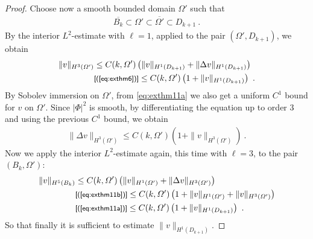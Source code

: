 \documentclass[a4paper,11pt,openright,twoside]{book}
\renewcommand{\Omega}{\varOmega}
\newcommand{\1}{\mathds{1}}
\newcommand{\commb}[1]{\textsf{{\footnotesize[#1]}}}
\newcommand{\qref}[1]{(\ref{#1})}
\theoremstyle{plain}
\theoremstyle{definition}
\theoremstyle{remark}
\begin{document}
\begin{proof}
	Choose now a smooth bounded domain $\Omega'$ such that
	\begin{align*}
		\overline{B_k}\subset \Omega' \subset \overline{\Omega'} \subset D_{k+1}
	\ . 
	\end{align*}
	By the interior $L^2$-estimate with $\ell=1$, applied to the pair $(\Omega',D_{k+1})$, we obtain
	\begin{align}\label{eq:exthm11a}
		\|v\|_{H^3(\Omega')} 
		&\leq C(k,\Omega')\left( \|v\|_{H^1(D_{k+1})}+\|\Delta v\|_{H^1(D_{k+1})}\right)\notag\\
		&\commb{\qref{eq:exthm6}}\leq C(k,\Omega')\left(1+\|v\|_{H^1(D_{k+1})}\right)
	\ . 
	\end{align}
	By Sobolev immersion on $\Omega'$, from \eqref{eq:exthm11a} we also get a uniform $C^1$ bound for $v$ on $\Omega'$. Since $|\Phi|^2$ is smooth, by differentiating the equation up to order $3$ and using the previous $C^1$ bound, we obtain
	\begin{align}\label{eq:exthm11b}
		\|\Delta v\|_{H^3(\Omega')}
		\leq C(k,\Omega')\left(1+\|v\|_{H^3(\Omega')}\right)
	\ . 
	\end{align}
	Now we apply the interior $L^2$-estimate again, this time with $\ell=3$, to the pair $(B_k,\Omega')$:
	\begin{align}\label{eq:exthm11}
		\|v\|_{H^5(B_k)} 
		&\leq C(k,\Omega') \left( \|v\|_{H^1(\Omega')} + \|\Delta v\|_{H^3(\Omega')}\right)\notag\\
		&\commb{\qref{eq:exthm11b}}\leq C(k,\Omega') \left( 1+\|v\|_{H^1(\Omega')} + \|v\|_{H^3(\Omega')}\right)\notag\\
		&\commb{\qref{eq:exthm11a}}\leq C(k,\Omega') \left( 1+\|v\|_{H^1(D_{k+1})}\right)
	\ . 
	\end{align}
	So that finally it is sufficient to estimate $\|v\|_{H^1(D_{k+1})}$.


\end{proof}
\end{document}
